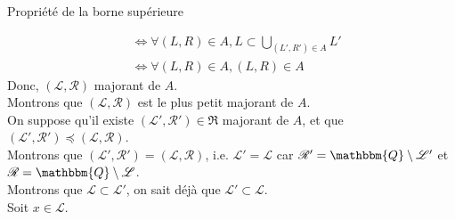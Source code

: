 \documentclass[a4paper]{report}
\newcommand{\Q}{\mathbbm{Q}}
\newcommand{\rel}{\preceq}
\begin{document}
\begin{section}{Propriété de la borne supérieure}
\begin{subsection}{}
\begin{align*}
																																		 & \iff \forall (L,R) \in A, L \subset \bigcup_{(L',R') \in A} L' \\
																																		 & \iff \forall (L,R) \in A, (L,R) \in A
				\end{align*}
				Donc, $(\mathcal{L},\mathcal{R})$ majorant de $A$.\\
				Montrons que $(\mathcal{L},\mathcal{R})$ est le plus petit majorant de $A$.\\
				On suppose qu'il existe $(\mathcal{L}', \mathcal{R}') \in \mathfrak{R}$ majorant de $A$, et que $(\mathcal{L}',\mathcal{R}') \rel (\mathcal{L},\mathcal{R})$.\\
				Montrons que $(\mathcal{L}',\mathcal{R}')=(\mathcal{L},\mathcal{R})$, i.e. $\mathcal{L}'=\mathcal{L}$ car $\mathcal{R}'=\Q\setminus\mathcal{L}'$ et $\mathcal{R}=\Q\setminus\mathcal{L}$.\\
				Montrons que $\mathcal{L} \subset \mathcal{L}'$, on sait déjà que $\mathcal{L}' \subset \mathcal{L}$.\\
				Soit $x \in \mathcal{L}$. %
				\reversemarginpar{}
		\end{subsection}
	\end{section}
\end{document}
